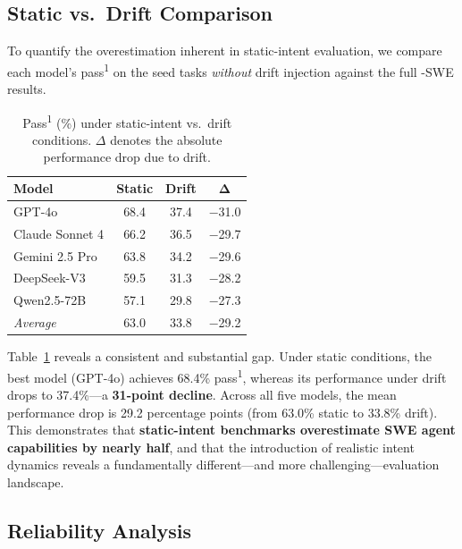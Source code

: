 \subsection{Static vs.\ Drift Comparison}
\label{sec:static-vs-drift}

To quantify the overestimation inherent in static-intent evaluation, we compare each model's pass\textsuperscript{1} on the seed tasks \emph{without} drift injection against the full \bench{}-SWE results.

\begin{table}[t]
\centering
\caption{Pass\textsuperscript{1} (\%) under static-intent vs.\ drift conditions. $\Delta$ denotes the absolute performance drop due to drift.}
\label{tab:static-vs-drift}
\small
\begin{tabular}{l cc c}
\toprule
\textbf{Model} & \textbf{Static} & \textbf{Drift} & $\boldsymbol{\Delta}$ \\
\midrule
GPT-4o          & 68.4 & 37.4 & $-$31.0 \\
Claude Sonnet 4 & 66.2 & 36.5 & $-$29.7 \\
Gemini 2.5 Pro  & 63.8 & 34.2 & $-$29.6 \\
DeepSeek-V3     & 59.5 & 31.3 & $-$28.2 \\
Qwen2.5-72B     & 57.1 & 29.8 & $-$27.3 \\
\midrule
\textit{Average} & 63.0 & 33.8 & $-$29.2 \\
\bottomrule
\end{tabular}
\end{table}

Table~\ref{tab:static-vs-drift} reveals a consistent and substantial gap. Under static conditions, the best model (GPT-4o) achieves 68.4\% pass\textsuperscript{1}, whereas its performance under drift drops to 37.4\%---a \textbf{31-point decline}. Across all five models, the mean performance drop is 29.2 percentage points (from 63.0\% static to 33.8\% drift). This demonstrates that \textbf{static-intent benchmarks overestimate SWE agent capabilities by nearly half}, and that the introduction of realistic intent dynamics reveals a fundamentally different---and more challenging---evaluation landscape.

\subsection{Reliability Analysis}
\label{sec:reliability}

